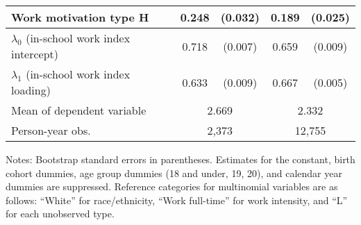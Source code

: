 \begin{table}[ht]
\begin{threeparttable}
\begin{tabular}{lcccc}
Work motivation type H & 0.248 & (0.032) & 0.189 & (0.025) \\ 
\midrule
$\lambda_{0}$ (in-school work index intercept) & 0.718 & (0.007) & 0.659 & (0.009) \\ 
$\lambda_{1}$ (in-school work index loading)   & 0.633 & (0.009) & 0.667 & (0.005) \\ 
\midrule
Mean of dependent variable & \multicolumn{2}{c}{ 2.669 } & \multicolumn{2}{c}{ 2.332 } \\ 
Person-year obs.  & \multicolumn{2}{c}{ 2,373 } & \multicolumn{2}{c}{ 12,755 } \\
\bottomrule
\end{tabular}
\footnotesize Notes: Bootstrap standard errors in parentheses. Estimates for the constant, birth cohort dummies, age group dummies (18 and under, 19, 20), and calendar year dummies are suppressed. Reference categories for multinomial variables are as follows: ``White'' for race/ethnicity, ``Work full-time'' for work intensity, and ``L'' for each unobserved type.

\end{threeparttable}
\end{table}
